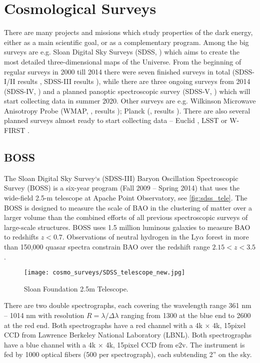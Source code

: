 \chapter{Cosmological Surveys}
There are many projects and missions which study properties of the dark energy, either as a main scientific goal, or as a complementary program. Among the big surveys are e.g. Sloan Digital Sky Surveys (SDSS, \cite{SDSS}) which aims to create the most detailed three-dimensional maps of the Universe. From the beginning of regular surveys in 2000 till 2014 there were seven finished surveys in total (SDSS-I/II results \cite{SDSS_I_II}, SDSS-III results \cite{BOSS_results}), while there are three ongoing surveys from 2014 (SDSS-IV, \cite{2017AJ....154...28B}) and a planned panoptic spectroscopic survey (SDSS-V, \cite{2017arXiv171103234K}) which will start collecting data in summer 2020. Other surveys are e.g. Wilkinson Microwave Anisotropy Probe (WMAP, \cite{WMAP}, results \cite{WMAP_results}); Planck (\cite{planck}, results \cite{planck_cosm}). There are also several planned surveys almost ready to start collecting data -- Euclid \parencite{euclid}, LSST \parencite{lsst} or W-FIRST \parencite{WFIRST_report}.

\section{BOSS}
The Sloan Digital Sky Survey`s (SDSS-III) Baryon Oscillation Spectroscopic Survey (BOSS) is a six-year program (Fall 2009 -- Spring 2014)  that uses the wide-field 2.5-m telescope at Apache Point Observatory, see \autoref{fig:sdss_tele}. The BOSS is designed to measure the scale of BAO in the clustering of matter over a larger volume than the combined efforts of all previous spectroscopic surveys of large-scale structures. BOSS uses 1.5 million luminous galaxies to measure BAO to redshifts $z<0.7$. Observations of neutral hydrogen in the Ly$\alpha$ forest in more than 150,000 quasar spectra constrain BAO over the redshift range $2.15 < z < 3.5$ \cite{BOSS}.
\begin{figure}[ht]
    \centering
    \texttt{[image: cosmo\_surveys/SDSS\_telescope\_new.jpg]}
    \caption{Sloan Foundation 2.5m Telescope.}
    \label{fig:sdss_tele}
\end{figure}

There are two double spectrographs, each covering the wavelength range 361 nm -- 1014 nm with resolution $R=\lambda/\Delta\lambda$ ranging from 1300 at the blue end to 2600 at the red end.  Both spectrographs have a red channel with a 4k $\times$ 4k, 15\um  pixel CCD from Lawrence Berkeley National Laboratory (LBNL). Both spectrographs have a blue channel with a 4k $\times$ 4k, 15\um  pixel CCD from  e2v. The instrument is fed by 1000 optical fibers (500 per spectrograph), each subtending 2'' on the sky.

